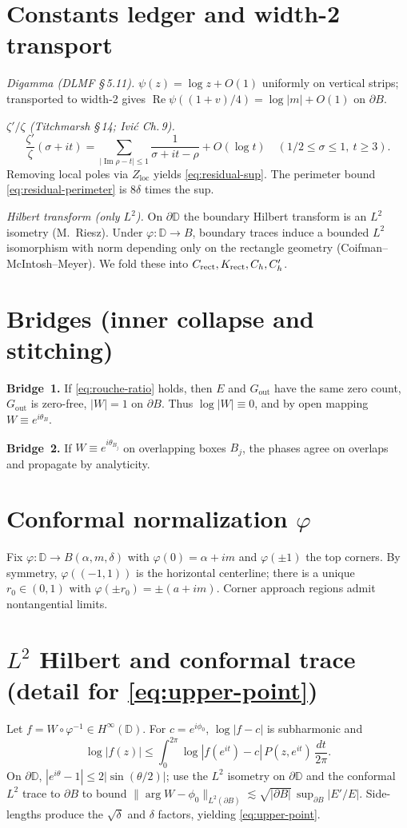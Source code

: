 \documentclass[11pt]{article}
\numberwithin{equation}{section}
\theoremstyle{remark}
\newcommand{\D}{\mathbb{D}}
\DeclareMathOperator{\Imag}{Im}
\DeclareMathOperator{\Real}{Re}
\newcommand{\Gout}{G_{\mathrm{out}}}
\newcommand{\Zloc}{Z_{\mathrm{loc}}}
\begin{document}
\section{Constants ledger and width-2 transport}\label{app:constants}
\emph{Digamma (DLMF §\,5.11).} $\psi(z)=\log z+O(1)$ uniformly on vertical strips; transported to width-2 gives $\Real\psi((1+v)/4)=\log|m|+O(1)$ on $\partial B$.

\noindent\emph{$\zeta'/\zeta$ (Titchmarsh §\,14; Ivi\'c Ch.\,9).}
\[
\frac{\zeta'}{\zeta}(\sigma+it)=\sum_{|\Imag\rho-t|\le 1}\frac{1}{\sigma+it-\rho}+O(\log t)\quad (1/2\le\sigma\le1,\ t\ge 3).
\]
Removing local poles via $\Zloc$ yields \eqref{eq:residual-sup}. The perimeter bound \eqref{eq:residual-perimeter} is $8\delta$ times the sup.

\noindent\emph{Hilbert transform (only $L^2$).} On $\partial\D$ the boundary Hilbert transform is an $L^2$ isometry (M.~Riesz). Under $\varphi:\D\to B$, boundary traces induce a bounded $L^2$ isomorphism with norm depending only on the rectangle geometry (Coifman--McIntosh--Meyer). We fold these into $C_{\rm rect},K_{\rm rect},C_h,C_h'$.

\section{Bridges (inner collapse and stitching)}\label{app:bridges}
\textbf{Bridge~1.} If \eqref{eq:rouche-ratio} holds, then $E$ and $\Gout$ have the same zero count, $\Gout$ is zero-free, $|W|=1$ on $\partial B$. Thus $\log|W|\equiv0$, and by open mapping $W\equiv e^{i\theta_B}$.

\noindent\textbf{Bridge~2.} If $W\equiv e^{i\theta_{B_j}}$ on overlapping boxes $B_j$, the phases agree on overlaps and propagate by analyticity.

\section{Conformal normalization $\varphi$}\label{app:conformal}
Fix $\varphi:\D\to B(\alpha,m,\delta)$ with $\varphi(0)=\alpha+im$ and $\varphi(\pm1)$ the top corners. By symmetry, $\varphi((-1,1))$ is the horizontal centerline; there is a unique $r_0\in(0,1)$ with $\varphi(\pm r_0)=\pm(a+im)$. Corner approach regions admit nontangential limits.

\section{$L^2$ Hilbert and conformal trace (detail for \texorpdfstring{\eqref{eq:upper-point}}{(4.1)})}\label{app:L2}
Let $f=W\circ\varphi^{-1}\in H^\infty(\D)$. For $c=e^{i\phi_0}$, $\log|f-c|$ is subharmonic and
\[
\log|f(z)|\le \int_{0}^{2\pi}\log|f(e^{it})-c|\,P(z,e^{it})\,\frac{dt}{2\pi}.
\]
On $\partial\D$, $|e^{i\theta}-1|\le 2|\sin(\theta/2)|$; use the $L^2$ isometry on $\partial\D$ and the conformal $L^2$ trace to $\partial B$ to bound $\|\arg W-\phi_0\|_{L^2(\partial B)}\lesssim \sqrt{|\partial B|}\,\sup_{\partial B}|E'/E|$. Side-lengths produce the $\sqrt{\delta}$ and $\delta$ factors, yielding \eqref{eq:upper-point}.
\end{document}
